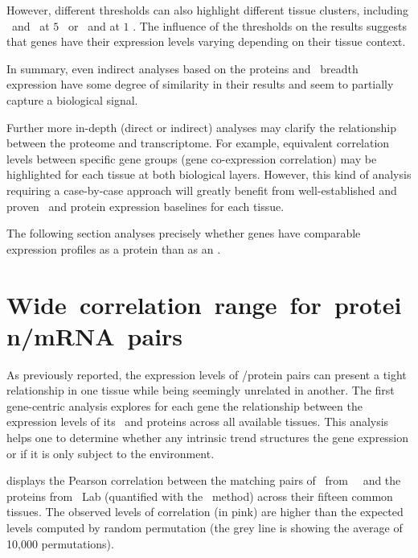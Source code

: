 However, different thresholds can also highlight different tissue clusters,
including \Rectum\ and \hColon\ at $5$ \FPKM\
or \Pancreas\ and \Gall{} at $1$ \FPKM{}.
The influence of the thresholds on the results suggests that
genes have their expression levels varying
depending on their tissue context.\mybr\

In summary,
even indirect analyses based on the proteins and \mRNAs\ breadth expression
have some degree of similarity in their results
and seem to partially capture a biological signal.\mybr\

Further more in-depth (direct or indirect) analyses
may clarify the relationship between the proteome and transcriptome.
For example, equivalent correlation levels between specific gene groups
(gene co-expression correlation) may be highlighted
for each tissue at both biological layers.
However, this kind of analysis requiring a case-by-case approach
will greatly benefit from
well-established and proven \mRNA\ and protein expression baselines
for each tissue.\mybr\

The following section  analyses precisely
whether genes have comparable expression profiles
as a protein than as an \mRNA{}.\mybr\
\vspace{-2.5mm}

\section{Wide~correlation~range~for~protein/mRNA~pairs}\label{sec:GenesCorRNAProt}
\vspace{-3mm}
As previously reported, %
the expression levels of \mRNA/protein pairs can present
a tight relationship in one tissue
while being seemingly unrelated in another.
The first gene-centric analysis explores for each gene
the relationship between the expression levels of its \mRNAs\ and proteins
across all available tissues.
This analysis helps one to determine
whether any intrinsic trend structures the gene expression
or if it is only subject to the environment.\mybr\

 displays the Pearson correlation
between the matching pairs of \mRNAs\ from \uhlen\ \etal\
and the proteins from \pandey\ Lab (quantified with the \PPKM\ method)
across their fifteen common tissues.
The observed levels of correlation (in pink) are higher
than the expected levels computed by random permutation
(the grey line is showing the average of 10,000 permutations).\mybr\


